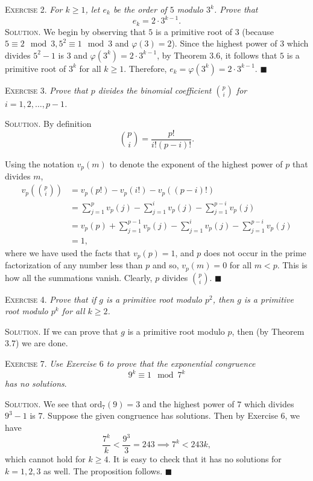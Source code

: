 \documentclass[11pt, leqno]{article}
\newcommand{\done}{\ensuremath{\blacksquare}}
\begin{document}
\textsc{Exercise 2}. \emph{For $k \geq 1$, let $e_k$ be the order of $5$ modulo $3^k$. Prove that 
\begin{displaymath}
e_k = 2\cdot 3^{k-1}.
\end{displaymath}}\textsc{Solution}. We begin by observing that $5$ is a primitive root of $3$ (because $5 \equiv 2 \mod 3, 5^2 \equiv 1 \mod 3$ and $\varphi(3) = 2$). Since the highest power of $3$ which divides $5^2-1$ is $3$ and $\varphi(3^k) = 2\cdot 3^{k-1}$, by Theorem $3.6$, it follows that $5$ is a primitive root of $3^k$ for all $k\geq 1$. Therefore, $e_k = \varphi(3^k) = 2\cdot 3^{k-1}$. \done

\textsc{Exercise 3}. \emph{Prove that $p$ divides the binomial coefficient $\binom{p}{i} $ for $i=1,2,\ldots, p-1$.}

\textsc{Solution}. By definition 
\begin{displaymath}
\binom{p}{i} = \frac{p!}{i!(p-i)!}.
\end{displaymath}

Using the notation $v_p(m)$ to denote the exponent of the highest power of $p$ that divides $m$, 
\begin{align*}
  v_p(\binom{p}{i}) &= v_p(p!) - v_p(i!) - v_p((p-i)!) \\
                    &= \sum_{j=1}^p v_p(j) - \sum_{j=1}^i v_p(j) - \sum_{j=1}^{p-i} v_p(j) \\
                    &= v_p(p) + \sum_{j=1}^{p-1} v_p(j) - \sum_{j=1}^i v_p(j) - \sum_{j=1}^{p-i} v_p(j) \\
                    &= 1,
\end{align*}
where we have used the facts that $v_p(p) = 1$, and $p$ does not occur in the prime factorization of any number less than $p$ and so, $v_p(m) = 0$ for all $m < p$. This is how all the summations vanish. Clearly, $p$ divides $\binom{p}{i}$. \done

\textsc{Exercise 4}. \emph{Prove that if $g$ is a primitive root modulo $p^2$, then $g$ is a primitive root modulo $p^k$ for all $k\geq 2$.}

\textsc{Solution}. If we can prove that $g$ is a primitive root modulo $p$, then (by Theorem $3.7$) we are done.

\textsc{Exercise 7}. \emph{Use Exercise $6$ to prove that the exponential congruence 
\begin{displaymath}
9^k \equiv 1 \mod 7^k
\end{displaymath}
has no solutions}.

\textsc{Solution.} We see that ord$_7(9) = 3$ and the highest power of $7$ which divides $9^3-1$ is $7$. Suppose the given congruence has solutions. Then by Exercise $6$, we have 
\begin{displaymath}
\frac{7^k}{k} < \frac{9^3}{3} = 243 \implies 7^k < 243k,
\end{displaymath}
which cannot hold for $k\geq 4$. It is easy to check that it has no solutions for $k=1,2,3$ as well. The proposition follows. \done
\end{document}
